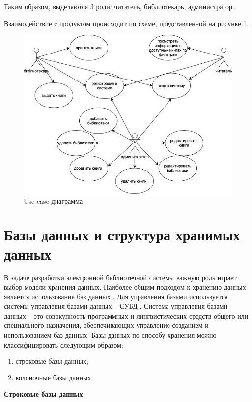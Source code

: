 Таким образом, выделяются 3 роли: читатель, библиотекарь, администратор.

Взаимодействие с продуктом происходит по схеме, представленной на рисунке \ref{fig:usecase}.

\begin{figure}[H]
	\centering
	\includegraphics[width = \linewidth]{img/use-case.jpg}
	\caption{Use-case диаграмма}
	\label{fig:usecase}
\end{figure}

\section{\label{subd}Базы данных и структура хранимых данных}

В задаче разработки электронной библиотечной системы важную роль играет выбор модели хранения данных. Наиболее общим подходом к хранению данных является использование баз данных \cite{bib:1}. Для управления базами используется системы управления базами данных -- СУБД \cite{bib:2}. Система управления базами данных -- это совокупность программных и лингвистических средств общего или специального назначения, обеспечивающих управление созданием и использованием баз данных.
\newpage
Базы данных по способу хранения можно классифицировать следующим образом:
\begin{enumerate}
    \item  строковые базы данных;
    \item  колоночные базы данных.
\end{enumerate}

\noindent\textbf{Строковые базы данных}

